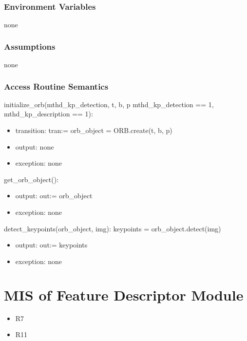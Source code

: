 \documentclass[12pt, titlepage]{article}
\begin{document}
\subsubsection{Environment Variables}
none

\subsubsection{Assumptions}
none
\subsubsection{Access Routine Semantics}

\noindent initialize\_orb(mthd\_kp\_detection, t, b, p 
\textbar \: mthd\_kp\_detection == 1, mthd\_kp\_description == 1):
\begin{itemize}
  \item transition: tran:= orb\_object = ORB.create(t, b, p) 
  \item output: none
  \item exception: none
\end{itemize}
\noindent get\_orb\_object():
\begin{itemize}
  \item output: out:= orb\_object
  \item exception: none
\end{itemize}
\noindent detect\_keypoints(orb\_object, img):\newline\newline
keypoints = orb\_object.detect(img)
\begin{itemize}
  \item output: out:= keypoints
  \item exception: none
\end{itemize}



\section{MIS of Feature Descriptor Module} \label{mFD}
\begin{itemize}
  \item R7
  \item R11
\end{itemize}
\end{document}
